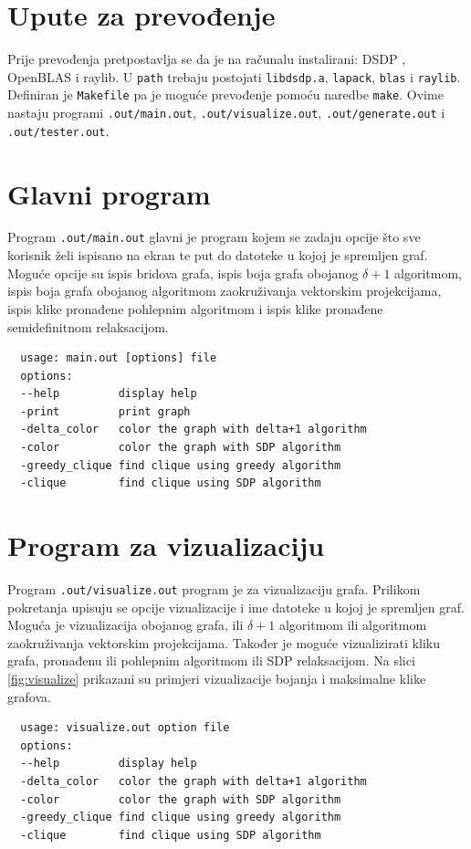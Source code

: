 \documentclass[diplomskirad]{fer}
\begin{document}
\section{Upute za prevođenje}
Prije prevođenja pretpostavlja se da je na računalu instalirani:  DSDP \cite{dsdp-user-guide}, OpenBLAS \cite{openBLAS} i raylib.
U \verb|path| trebaju postojati \verb|libdsdp.a|, \verb|lapack|, \verb|blas| i \verb|raylib|. Definiran je \verb|Makefile| pa je moguće
prevođenje pomoću naredbe \verb|make|. Ovime nastaju programi \verb|.out/main.out|, \verb|.out/visualize.out|, \verb|.out/generate.out| i 
\verb|.out/tester.out|.

\section{Glavni program}
Program \verb|.out/main.out| glavni je program kojem se zadaju opcije što sve korisnik želi ispisano na ekran te put do datoteke u kojoj je spremljen
graf. Moguće opcije su ispis bridova grafa, ispis boja grafa obojanog $\delta + 1$ algoritmom, ispis boja grafa obojanog algoritmom zaokruživanja
vektorskim projekcijama, ispis klike pronađene pohlepnim algoritmom i ispis klike pronađene semidefinitnom relaksacijom.

\begin{verbatim}
  usage: main.out [options] file
  options:
  --help         display help
  -print         print graph
  -delta_color   color the graph with delta+1 algorithm
  -color         color the graph with SDP algorithm
  -greedy_clique find clique using greedy algorithm
  -clique        find clique using SDP algorithm
\end{verbatim}

\section{Program za vizualizaciju}
Program \verb|.out/visualize.out| program je za vizualizaciju grafa. Prilikom pokretanja upisuju se opcije vizualizacije i ime datoteke u kojoj je 
spremljen graf. Moguća je vizualizacija obojanog grafa, ili $\delta + 1$ algoritmom ili algoritmom zaokruživanja vektorskim projekcijama. Također je
moguće vizualizirati kliku grafa, pronađenu ili pohlepnim algoritmom ili SDP relaksacijom. Na slici \ref{fig:visualize} prikazani su primjeri
vizualizacije bojanja i maksimalne klike grafova.

\begin{verbatim}
  usage: visualize.out option file
  options:
  --help         display help
  -delta_color   color the graph with delta+1 algorithm
  -color         color the graph with SDP algorithm
  -greedy_clique find clique using greedy algorithm
  -clique        find clique using SDP algorithm
\end{verbatim}
\end{document}
